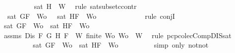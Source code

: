 \begin{isabellebody}
\ \ \ \ \ \ \ \ \isamarkupfalse%
\ {\isacartoucheopen}{\isasymnot}sat\ {\isacharparenleft}{\isacharbraceleft}H{\isacharbraceright}\ {\isasymunion}\ W{}{\isacharparenright}{\isacartoucheclose}\ \isamarkupfalse%
\ {\isacharparenleft}rule\ sat{\isacharunderscore}subset{\isacharunderscore}ccontr{\isacharparenright}\isanewline
\ \ \ \ \ \ \isamarkupfalse%
\ {\isachardoublequoteopen}{\isasymnot}\ sat\ {\isacharparenleft}{\isacharbraceleft}G{\isacharcomma}F{\isacharbraceright}\ {\isasymunion}\ {\isacharquery}Wo{\isacharparenright}\ {\isasymand}\ {\isasymnot}\ sat\ {\isacharparenleft}{\isacharbraceleft}H{\isacharcomma}F{\isacharbraceright}\ {\isasymunion}\ {\isacharquery}Wo{\isacharparenright}{\isachardoublequoteclose}\isanewline
\ \ \ \ \ \ \ \ \isamarkupfalse%
\ {}\ {}\ \isamarkupfalse%
\ {\isacharparenleft}rule\ conjI{\isacharparenright}\isanewline
\ \ \ \ \ \ \isamarkupfalse%
\ {\isachardoublequoteopen}sat\ {\isacharparenleft}{\isacharbraceleft}G{\isacharcomma}F{\isacharbraceright}\ {\isasymunion}\ {\isacharquery}Wo{\isacharparenright}\ {\isasymor}\ sat\ {\isacharparenleft}{\isacharbraceleft}H{\isacharcomma}F{\isacharbraceright}\ {\isasymunion}\ {\isacharquery}Wo{\isacharparenright}{\isachardoublequoteclose}\isanewline
\ \ \ \ \ \ \ \ \isamarkupfalse%
\ assms{\isacharparenleft}{}{\isacharparenright}\ {\isacartoucheopen}Dis\ F\ G\ H{\isacartoucheclose}\ {\isacartoucheopen}F\ {\isasymin}\ W{\isacartoucheclose}\ {\isacartoucheopen}finite\ {\isacharquery}Wo{\isacartoucheclose}\ {\isacartoucheopen}{\isacharquery}Wo\ {\isasymsubseteq}\ W{\isacartoucheclose}\ \isamarkupfalse%
\ {\isacharparenleft}rule\ pcp{\isacharunderscore}colecComp{\isacharunderscore}DIS{\isacharunderscore}sat{\isacharparenright}\isanewline
\ \ \ \ \ \ \isamarkupfalse%
\ \isamarkupfalse%
\ {\isachardoublequoteopen}{\isasymnot}{\isasymnot}{\isacharparenleft}sat\ {\isacharparenleft}{\isacharbraceleft}G{\isacharcomma}F{\isacharbraceright}\ {\isasymunion}\ {\isacharquery}Wo{\isacharparenright}\ {\isasymor}\ sat\ {\isacharparenleft}{\isacharbraceleft}H{\isacharcomma}F{\isacharbraceright}\ {\isasymunion}\ {\isacharquery}Wo{\isacharparenright}{\isacharparenright}{\isachardoublequoteclose}\isanewline
\ \ \ \ \ \ \ \ \isamarkupfalse%
\ {\isacharparenleft}simp\ only{\isacharcolon}\ not{\isacharunderscore}not{\isacharparenright}\isanewline
\ \ \ \ \ \ \isamarkupfalse%

\end{isabellebody}
